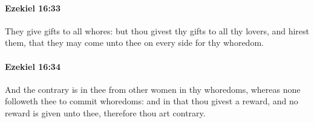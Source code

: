 		\paragraph{Ezekiel 16:33} %
			\label{EZEKIEL-16-33}

			They give gifts to all whores: but thou givest thy gifts to all thy lovers, and hirest them, that they may come unto thee on every side for thy whoredom.


		\paragraph{Ezekiel 16:34} %
			\label{EZEKIEL-16-34}

			And the contrary is in thee from other women in thy whoredoms, whereas none followeth thee to commit whoredoms: and in that thou givest a reward, and no reward is given unto thee, therefore thou art contrary.



